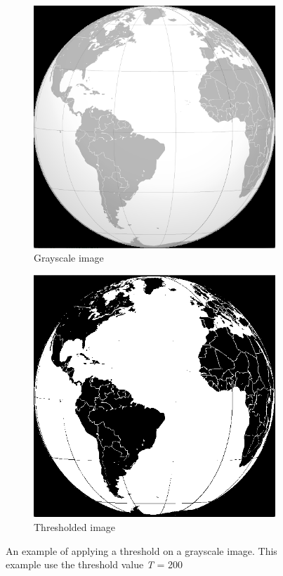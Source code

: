 \begin{figure}
        \centering
        \begin{subfigure}[b]{0.3\textwidth}
                \includegraphics[scale = 0.2]{img/globe}
                \caption{Grayscale image}
        \end{subfigure}
		\quad
        \begin{subfigure}[b]{0.3\textwidth}
                \includegraphics[scale = 0.2]{img/post_threshold}
                \caption{Thresholded image}
        \end{subfigure}
		\caption{An example of applying a threshold on a grayscale image. This example use the threshold value \textit{T} = 200}
		\label{fig:threshold_example}
\end{figure}

